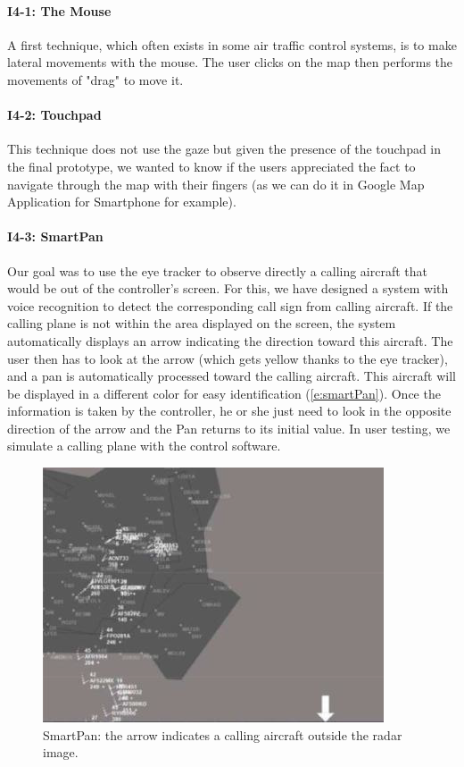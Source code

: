 \paragraph{I4-1: The Mouse}
A first technique, which often exists in some air traffic
control systems, is to make lateral movements with the
mouse. The user clicks on the map then performs the
movements of "drag" to move it.
\paragraph{I4-2: Touchpad}
This technique does not use the gaze but given the presence
of the touchpad in the final prototype, we wanted to know if
the users appreciated the fact to navigate through the map
with their fingers (as we can do it in Google Map
Application for Smartphone for example).
\paragraph{I4-3: SmartPan}
Our goal was to use the eye tracker to observe directly a
calling aircraft that would be out of the controller's screen.
For this, we have designed a system with voice recognition
to detect the corresponding call sign from calling aircraft. If
the calling plane is not within the area displayed on the
screen, the system automatically displays an arrow
indicating the direction toward this aircraft. The user then
has to look at the arrow (which gets yellow thanks to the eye
tracker), and a pan is automatically processed toward the
calling aircraft. This aircraft will be displayed in a different
color for easy identification (\autoref{e:smartPan}). Once the information
is taken by the controller, he or she just need to look in the
opposite direction of the arrow and the Pan
returns to its initial value. In user testing, we simulate a
calling plane with the control software.
\begin{figure}
 \centering
	\includegraphics{Figures/smartPan.png}
	\caption{
	SmartPan: the arrow indicates a calling
aircraft outside the radar image.}
	\label{e:smartPan}
\end{figure}

